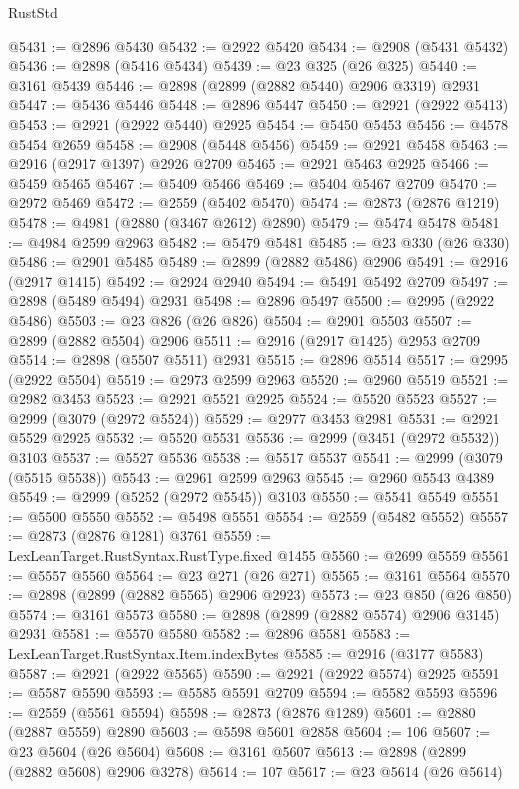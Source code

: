 \begin{lexlean}{RustStd}
\begin{coremodule}
@5431 := @2896 @5430
@5432 := @2922 @5420
@5434 := @2908 (@5431 @5432)
@5436 := @2898 (@5416 @5434)
@5439 := @23 @325 (@26 @325)
@5440 := @3161 @5439
@5446 := @2898 (@2899 (@2882 @5440) @2906 @3319) @2931
@5447 := @5436 @5446
@5448 := @2896 @5447
@5450 := @2921 (@2922 @5413)
@5453 := @2921 (@2922 @5440) @2925
@5454 := @5450 @5453
@5456 := @4578 @5454 @2659
@5458 := @2908 (@5448 @5456)
@5459 := @2921 @5458
@5463 := @2916 (@2917 @1397) @2926 @2709
@5465 := @2921 @5463 @2925
@5466 := @5459 @5465
@5467 := @5409 @5466
@5469 := @5404 @5467 @2709
@5470 := @2972 @5469
@5472 := @2559 (@5402 @5470)
@5474 := @2873 (@2876 @1219)
@5478 := @4981 (@2880 (@3467 @2612) @2890)
@5479 := @5474 @5478
@5481 := @4984 @2599 @2963
@5482 := @5479 @5481
@5485 := @23 @330 (@26 @330)
@5486 := @2901 @5485
@5489 := @2899 (@2882 @5486) @2906
@5491 := @2916 (@2917 @1415)
@5492 := @2924 @2940
@5494 := @5491 @5492 @2709
@5497 := @2898 (@5489 @5494) @2931
@5498 := @2896 @5497
@5500 := @2995 (@2922 @5486)
@5503 := @23 @826 (@26 @826)
@5504 := @2901 @5503
@5507 := @2899 (@2882 @5504) @2906
@5511 := @2916 (@2917 @1425) @2953 @2709
@5514 := @2898 (@5507 @5511) @2931
@5515 := @2896 @5514
@5517 := @2995 (@2922 @5504)
@5519 := @2973 @2599 @2963
@5520 := @2960 @5519
@5521 := @2982 @3453
@5523 := @2921 @5521 @2925
@5524 := @5520 @5523
@5527 := @2999 (@3079 (@2972 @5524))
@5529 := @2977 @3453 @2981
@5531 := @2921 @5529 @2925
@5532 := @5520 @5531
@5536 := @2999 (@3451 (@2972 @5532)) @3103
@5537 := @5527 @5536
@5538 := @5517 @5537
@5541 := @2999 (@3079 (@5515 @5538))
@5543 := @2961 @2599 @2963
@5545 := @2960 @5543 @4389
@5549 := @2999 (@5252 (@2972 @5545)) @3103
@5550 := @5541 @5549
@5551 := @5500 @5550
@5552 := @5498 @5551
@5554 := @2559 (@5482 @5552)
@5557 := @2873 (@2876 @1281) @3761
@5559 := LexLeanTarget.RustSyntax.RustType.fixed @1455
@5560 := @2699 @5559
@5561 := @5557 @5560
@5564 := @23 @271 (@26 @271)
@5565 := @3161 @5564
@5570 := @2898 (@2899 (@2882 @5565) @2906 @2923)
@5573 := @23 @850 (@26 @850)
@5574 := @3161 @5573
@5580 := @2898 (@2899 (@2882 @5574) @2906 @3145) @2931
@5581 := @5570 @5580
@5582 := @2896 @5581
@5583 := LexLeanTarget.RustSyntax.Item.indexBytes
@5585 := @2916 (@3177 @5583)
@5587 := @2921 (@2922 @5565)
@5590 := @2921 (@2922 @5574) @2925
@5591 := @5587 @5590
@5593 := @5585 @5591 @2709
@5594 := @5582 @5593
@5596 := @2559 (@5561 @5594)
@5598 := @2873 (@2876 @1289)
@5601 := @2880 (@2887 @5559) @2890
@5603 := @5598 @5601 @2858
@5604 := 106
@5607 := @23 @5604 (@26 @5604)
@5608 := @3161 @5607
@5613 := @2898 (@2899 (@2882 @5608) @2906 @3278)
@5614 := 107
@5617 := @23 @5614 (@26 @5614)

\end{coremodule}
\end{lexlean}
